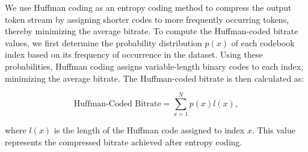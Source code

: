 \documentclass{article} %
\begin{document}
We use Huffman coding \citep{huffman1952method} as an entropy coding method to compress the output token stream by assigning shorter codes to more frequently occurring tokens, thereby minimizing the average bitrate. To compute the Huffman-coded bitrate values, we first determine the probability distribution \(p(x)\) of each codebook index based on its frequency of occurrence in the dataset. Using these probabilities, Huffman coding assigns variable-length binary codes to each index, minimizing the average bitrate. The Huffman-coded bitrate is then calculated as:

\[
\text{Huffman-Coded Bitrate} = \sum_{x=1}^{N} p(x) l(x),
\]

where \(l(x)\) is the length of the Huffman code assigned to index \(x\). This value represents the compressed bitrate achieved after entropy coding.
\end{document}
